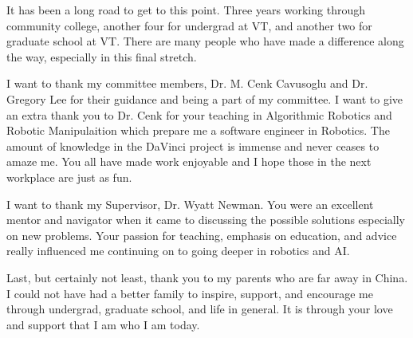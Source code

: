 \begin{sloppypar}

It has been a long road to get to this point. Three years working through community college, another four for undergrad at VT, and another two for graduate school at VT. There are many people who have made a difference along the way, especially in this final stretch.

I want to thank my committee members, Dr. M. Cenk Cavusoglu and Dr. Gregory Lee for their guidance and being a part of my committee. I want to give an extra thank you to Dr. Cenk for your teaching in Algorithmic Robotics and Robotic Manipulaition which prepare me a software engineer in Robotics. The amount of knowledge in the DaVinci project is immense and never ceases to amaze me. You all have made work enjoyable and I hope those in the next workplace are just as fun.

I want to thank my Supervisor, Dr. Wyatt Newman. You were an excellent mentor and navigator when it came to discussing the possible solutions especially on new problems. Your passion for teaching, emphasis on education, and advice really influenced me continuing on to going deeper in robotics and AI.

Last, but certainly not least, thank you to my parents who are far away in China. I could not have had a better family to inspire, support, and encourage me through undergrad, graduate school, and life in general. It is through your love and support that I am who I am today.

\end{sloppypar}